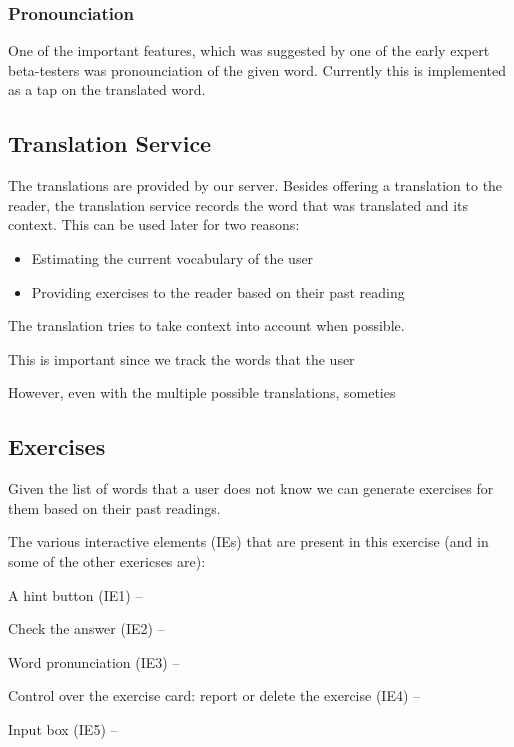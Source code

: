 \subsubsection{Pronounciation}
One of the important features, which was suggested by one of the early expert beta-testers was pronounciation of the given word. Currently this is implemented as a tap on the translated word.


\subsection {Translation Service}

The translations are provided by our server. Besides offering a translation to the reader, the translation service records the word that was translated and its context. This can be used later for two reasons: 

\begin{itemize}
	\item Estimating the current vocabulary of the user
	\item Providing exercises to the reader based on their past reading
\end{itemize}

The translation tries to take context into account when possible. 


This is important since we track the words that the user 


However, even with the multiple possible translations, someties 


\subsection {Exercises}

Given the list of words that a user does not know we can generate exercises for them based on their past readings.

The various interactive elements (IEs) that are present in this exercise (and in some of the other exericses are): 

\begin{description}
	\item A hint button (IE1) --
	\item Check the answer (IE2) -- 
	\item Word pronunciation (IE3) -- 
	\item Control over the exercise card: report or delete the exercise (IE4) -- 
	\item Input box (IE5) -- 
\end{description}

